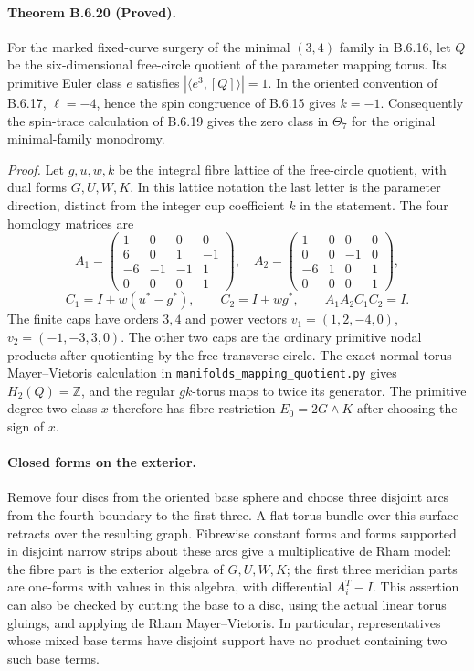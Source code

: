 \paragraph{Theorem B.6.20 (Proved).}
For the marked fixed-curve surgery of the minimal $(3,4)$ family in
B.6.16, let $Q$ be the six-dimensional free-circle quotient of the
parameter mapping torus. Its primitive Euler class $e$ satisfies
$|\langle e^3,[Q]\rangle|=1$. In the oriented convention of B.6.17,
$\ell=-4$, hence the spin congruence of B.6.15 gives $k=-1$.
Consequently the spin-trace calculation of B.6.19 gives the zero class
in $\Theta_7$ for the original minimal-family monodromy.

\emph{Proof.}
Let $g,u,w,k$ be the integral fibre lattice of the free-circle quotient,
with dual forms $G,U,W,K$.  In this lattice notation the last
letter is the parameter direction, distinct from the integer cup
coefficient $k$ in the statement.  The four homology matrices are
\[
 A_1=\begin{pmatrix}1&0&0&0\\6&0&1&-1\\-6&-1&-1&1\\0&0&0&1\end{pmatrix},\quad
 A_2=\begin{pmatrix}1&0&0&0\\0&0&-1&0\\-6&1&0&1\\0&0&0&1\end{pmatrix},
\]
\[
 C_1=I+w(u^*-g^*),\qquad C_2=I+wg^*,\qquad A_1A_2C_1C_2=I.
\]
The finite caps have orders $3,4$ and power vectors
$v_1=(1,2,-4,0)$, $v_2=(-1,-3,3,0)$.
The other two caps are the ordinary primitive nodal products after
quotienting by the free transverse circle. The exact normal-torus
Mayer--Vietoris calculation in \texttt{manifolds\_mapping\_quotient.py} gives
$H_2(Q)=\mathbb Z$, and the regular $gk$-torus maps to twice its generator.
The primitive degree-two class $x$ therefore has fibre restriction
$E_0=2G\wedge K$ after choosing the sign of $x$.

\paragraph{Closed forms on the exterior.}
Remove four discs from the oriented base sphere and choose three disjoint
arcs from the fourth boundary to the first three.  A flat torus bundle over
this surface retracts over the resulting graph. Fibrewise constant forms
and forms supported in disjoint narrow strips about these arcs give a
multiplicative de Rham model: the fibre part is the exterior algebra of
$G,U,W,K$; the first three meridian parts are one-forms with values in this
algebra, with differential $A_i^T-I$.  This assertion can also be checked
by cutting the base to a disc, using the actual linear torus gluings, and
applying de Rham Mayer--Vietoris. In particular, representatives whose
mixed base terms have disjoint support have no product containing two
such base terms.


